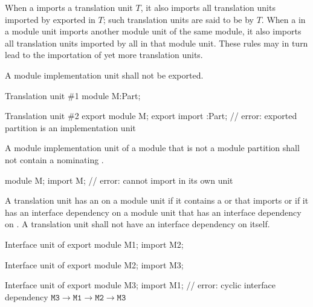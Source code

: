 \pnum
When a  imports
a translation unit $T$, it also imports
all translation units imported by
exported 
in $T$; such translation units are
said to be  by $T$.
When a  in a module unit imports
another module unit of the same module, it also imports
all translation units imported by
all 
in that module unit.
These rules may in turn lead to the importation of yet more
translation units.

\pnum
A module implementation unit shall not be exported.
\begin{example}
\begin{codeblocktu}{Translation unit \#1}
module M:Part;
\end{codeblocktu}

\begin{codeblocktu}{Translation unit \#2}
export module M;
export import :Part;    // error: exported partition  is an implementation unit
\end{codeblocktu}
\end{example}

\pnum
A module implementation unit of a module 
that is not a module partition
shall not contain a 
nominating .
\begin{example}
\begin{codeblock}
module M;
import M;               // error: cannot import  in its own unit
\end{codeblock}
\end{example}

\pnum
A translation unit has an  on a module unit 
if it contains a  or
 that imports  or if it has
an interface dependency on a module unit that has an interface dependency on .
A translation unit shall not have an interface dependency on itself.
\begin{example}
\begin{codeblocktu}{Interface unit of }
export module M1;
import M2;
\end{codeblocktu}

\begin{codeblocktu}{Interface unit of }
export module M2;
import M3;
\end{codeblocktu}

\begin{codeblocktu}{Interface unit of }
export module M3;
import M1;              // error: cyclic interface dependency $\mathtt{M3} \rightarrow \mathtt{M1} \rightarrow \mathtt{M2} \rightarrow \mathtt{M3}$
\end{codeblocktu}
\end{example}

